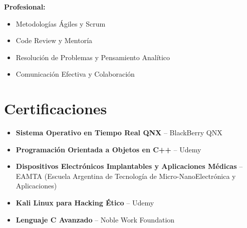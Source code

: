 \documentclass[11pt,a4paper]{article}
\begin{document}
\vspace{4pt}

\noindent\textbf{Profesional:}
\begin{itemize}[leftmargin=*, nosep, topsep=2pt]
    \item Metodolog\'{i}as \'{A}giles y Scrum
    \item Code Review y Mentor\'{i}a
    \item Resoluci\'{o}n de Problemas y Pensamiento Anal\'{i}tico
    \item Comunicaci\'{o}n Efectiva y Colaboraci\'{o}n
\end{itemize}

\section{Certificaciones}

\begin{itemize}[leftmargin=*, nosep, topsep=2pt]
    \item \textbf{Sistema Operativo en Tiempo Real QNX} -- BlackBerry QNX
    \item \textbf{Programaci\'{o}n Orientada a Objetos en C++} -- Udemy
    \item \textbf{Dispositivos Electr\'{o}nicos Implantables y Aplicaciones M\'{e}dicas} -- EAMTA (Escuela Argentina de Tecnolog\'{i}a de Micro-NanoElectr\'{o}nica y Aplicaciones)
    \item \textbf{Kali Linux para Hacking \'{E}tico} -- Udemy
    \item \textbf{Lenguaje C Avanzado} -- Noble Work Foundation
\end{itemize}
\end{document}
